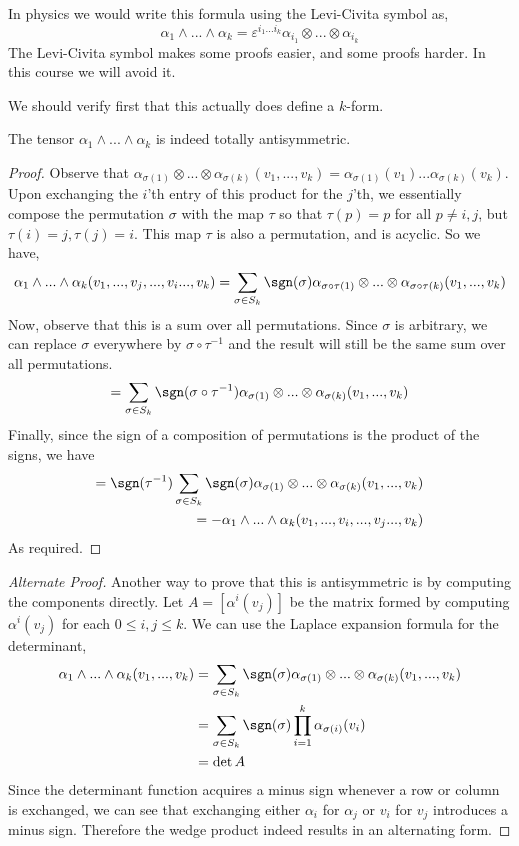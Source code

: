 \begin{physics*}
    In physics we would write this formula using the Levi-Civita symbol as,
    \[\alpha_1\wedge...\wedge\alpha_k = \varepsilon^{i_1...i_k}\alpha_{i_1}\otimes...\otimes \alpha_{i_k}\]
    The Levi-Civita symbol makes some proofs easier, and some proofs harder. In this course we will avoid it.
\end{physics*}
We should verify first that this actually does define a $k$-form.
\begin{thm}
    The tensor $\alpha_1\wedge...\wedge\alpha_k$ is indeed totally antisymmetric.
\end{thm}
\begin{proof}Observe that $\alpha_{\sigma(1)}\otimes...\otimes \alpha_{\sigma(k)}(v_1,...,v_k) = \alpha_{\sigma(1)}(v_1)...\alpha_{\sigma(k)}(v_k)$. Upon exchanging the $i$'th entry of this product for the $j$'th, we essentially compose the permutation $\sigma$ with the map $\tau$ so that $\tau(p)=p$ for all $p\neq i,j$, but $\tau(i)=j,\tau(j)=i$. This map $\tau$ is also a permutation, and is acyclic. So we have,
\[\alpha_1\wedge...\wedge \alpha_k(v_1,...,v_j,...,v_i...,v_k) = \sum_{\sigma \in S_k}\sgn(\sigma)\alpha_{\sigma\circ \tau(1)}\otimes...\otimes \alpha_{\sigma\circ \tau(k)}(v_1,...,v_k)\]
Now, observe that this is a sum over all permutations. Since $\sigma$ is arbitrary, we can replace $\sigma$ everywhere by $\sigma\circ \tau^{-1}$ and the result will still be the same sum over all permutations.
\[=\sum_{\sigma \in S_k}\sgn(\sigma\circ \tau^{-1})\alpha_{\sigma(1)}\otimes...\otimes \alpha_{\sigma(k)}(v_1,...,v_k)\]
Finally, since the sign of a composition of permutations is the product of the signs, we have
\begin{align*}=\sgn(\tau^{-1})\sum_{\sigma \in S_k}\sgn(\sigma)\alpha_{\sigma(1)}\otimes...\otimes \alpha_{\sigma(k)}(v_1,...,v_k)\\=-\alpha_1\wedge...\wedge \alpha_k(v_1,...,v_i,...,v_j...,v_k)\end{align*}
As required. \end{proof}
\begin{proof}[Alternate Proof]
Another way to prove that this is antisymmetric is by computing the components directly. Let $A = [\alpha^i(v_j)]$ be the matrix formed by computing $\alpha^i(v_j)$ for each $0\leq i,j\leq k$. We can use the Laplace expansion formula for the determinant,
\begin{align*}
\alpha_1\wedge...\wedge \alpha_k(v_1,...,v_k) &= \sum_{\sigma \in S_k}\sgn(\sigma)\alpha_{\sigma(1)}\otimes...\otimes \alpha_{\sigma(k)}(v_1,...,v_k)\\
&= \sum_{\sigma \in S_k} \sgn(\sigma) \prod_{i=1}^k \alpha_{\sigma(i)}(v_i)\\
&= \det A
\end{align*}
Since the determinant function acquires a minus sign whenever a row or column is exchanged, we can see that exchanging either $\alpha_i$ for $\alpha_j$ or $v_i$ for $v_j$ introduces a minus sign. Therefore the wedge product indeed results in an alternating form.
\end{proof}


